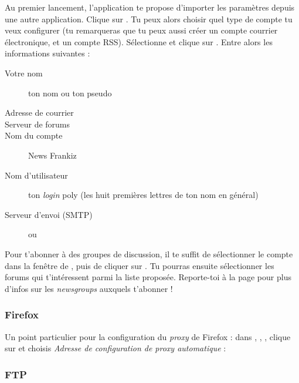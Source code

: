 Au premier lancement, l'application te propose d'importer les paramètres depuis une autre application. Clique sur . Tu peux alors choisir quel type de compte tu veux configurer (tu remarqueras que tu peux aussi créer un compte courrier électronique, et un compte RSS). Sélectionne  et clique sur . Entre alors les informations suivantes :

\begin{description}
  \item[Votre nom] ton nom ou ton pseudo
  \item[Adresse de courrier] 
  \item[Serveur de forums] 
  \item[Nom du compte] News Frankiz
  \item[Nom d'utilisateur] ton \emph{login }poly (les huit premières lettres de ton nom en général)
  \item[Serveur d'envoi (SMTP)]  ou 
\end{description}


Pour t'abonner à des groupes de discussion, il te suffit de sélectionner le compte  dans la fenêtre  de , puis de cliquer sur . Tu pourras ensuite sélectionner les forums qui t'intéressent parmi la liste proposée. Reporte-toi à la page \pageref{newsgroups} pour plus d'infos sur les \emph{newsgroups} auxquels t'abonner !

\subsubsection{Firefox}
Un point particulier pour la configuration du \emph{proxy} de Firefox : dans , , , clique sur  et choisis \emph{Adresse de configuration de proxy automatique} : 



\subsubsection{FTP}

